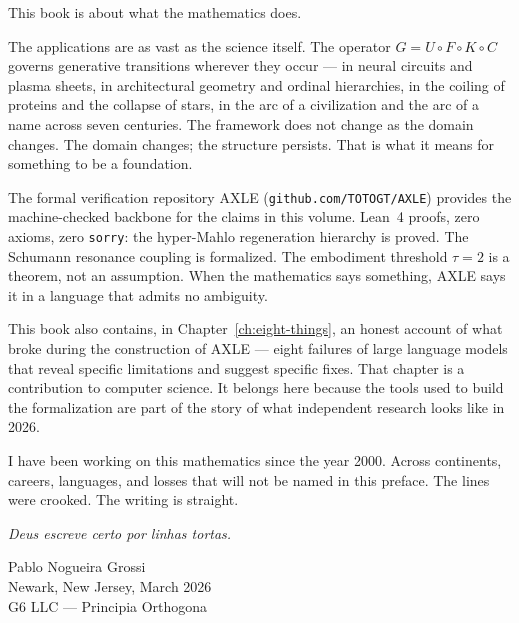 This book is about what the mathematics does.

The applications are as vast as the science itself. The operator
$G = U \circ F \circ K \circ C$ governs generative transitions
wherever they occur --- in neural circuits and plasma sheets, in
architectural geometry and ordinal hierarchies, in the coiling of
proteins and the collapse of stars, in the arc of a civilization
and the arc of a name across seven centuries. The framework does
not change as the domain changes. The domain changes; the structure
persists. That is what it means for something to be a foundation.

The formal verification repository AXLE (\texttt{github.com/TOTOGT/AXLE})
provides the machine-checked backbone for the claims in this volume.
Lean~4 proofs, zero axioms, zero \texttt{sorry}: the hyper-Mahlo
regeneration hierarchy is proved. The Schumann resonance coupling
is formalized. The embodiment threshold $\tau = 2$ is a theorem,
not an assumption. When the mathematics says something, AXLE says
it in a language that admits no ambiguity.

This book also contains, in Chapter~\ref{ch:eight-things}, an honest
account of what broke during the construction of AXLE --- eight
failures of large language models that reveal specific limitations
and suggest specific fixes. That chapter is a contribution to
computer science. It belongs here because the tools used to build
the formalization are part of the story of what independent research
looks like in 2026.

I have been working on this mathematics since the year 2000.
Across continents, careers, languages, and losses that will not
be named in this preface. The lines were crooked. The writing
is straight.

\textit{Deus escreve certo por linhas tortas.}

\bigskip
\begin{flushright}
Pablo Nogueira Grossi\\
Newark, New Jersey, March 2026\\
G6 LLC --- Principia Orthogona
\end{flushright}
\Large{}

\cleardoublepage

\tableofcontents

\mainmatter

